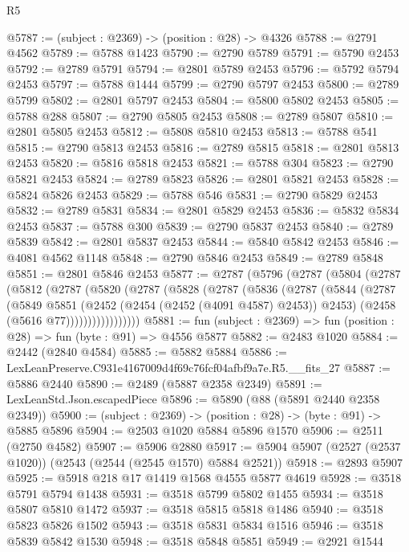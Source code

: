 \begin{lexlean}{R5}
\begin{coremodule}
@5787 := (subject : @2369) -> (position : @28) -> @4326
@5788 := @2791 @4562
@5789 := @5788 @1423
@5790 := @2790 @5789
@5791 := @5790 @2453
@5792 := @2789 @5791
@5794 := @2801 @5789 @2453
@5796 := @5792 @5794 @2453
@5797 := @5788 @1444
@5799 := @2790 @5797 @2453
@5800 := @2789 @5799
@5802 := @2801 @5797 @2453
@5804 := @5800 @5802 @2453
@5805 := @5788 @288
@5807 := @2790 @5805 @2453
@5808 := @2789 @5807
@5810 := @2801 @5805 @2453
@5812 := @5808 @5810 @2453
@5813 := @5788 @541
@5815 := @2790 @5813 @2453
@5816 := @2789 @5815
@5818 := @2801 @5813 @2453
@5820 := @5816 @5818 @2453
@5821 := @5788 @304
@5823 := @2790 @5821 @2453
@5824 := @2789 @5823
@5826 := @2801 @5821 @2453
@5828 := @5824 @5826 @2453
@5829 := @5788 @546
@5831 := @2790 @5829 @2453
@5832 := @2789 @5831
@5834 := @2801 @5829 @2453
@5836 := @5832 @5834 @2453
@5837 := @5788 @300
@5839 := @2790 @5837 @2453
@5840 := @2789 @5839
@5842 := @2801 @5837 @2453
@5844 := @5840 @5842 @2453
@5846 := @4081 @4562 @1148
@5848 := @2790 @5846 @2453
@5849 := @2789 @5848
@5851 := @2801 @5846 @2453
@5877 := @2787
    (@5796
      (@2787
        (@5804
          (@2787
            (@5812
              (@2787
                (@5820
                  (@2787
                    (@5828
                      (@2787
                        (@5836
                          (@2787
                            (@5844
                              (@2787
                                (@5849
                                  @5851
                                  (@2452 (@2454 (@2452 (@4091 @4587) @2453)) @2453)
                                  (@2458 (@5616 @77)))))))))))))))))
@5881 := fun (subject : @2369) => fun (position : @28) => fun (byte : @91) => @4556 @5877
@5882 := @2483 @1020
@5884 := @2442 (@2840 @4584)
@5885 := @5882 @5884
@5886 := LexLeanPreserve.C931e4167009d4f69c76fcf04afbf9a7e.R5.__fits_27
@5887 := @5886 @2440
@5890 := @2489 (@5887 @2358 @2349)
@5891 := LexLeanStd.Json.escapedPiece
@5896 := @5890 (@88 (@5891 @2440 @2358 @2349))
@5900 := (subject : @2369) -> (position : @28) -> (byte : @91) -> @5885 @5896
@5904 := @2503 @1020 @5884 @5896 @1570
@5906 := @2511 (@2750 @4582)
@5907 := @5906 @2880
@5917 := @5904 @5907 (@2527 (@2537 @1020)) (@2543 (@2544 (@2545 @1570) @5884 @2521))
@5918 := @2893 @5907
@5925 := @5918 @218 @17 @1419 @1568 @4555 @5877 @4619
@5928 := @3518 @5791 @5794 @1438
@5931 := @3518 @5799 @5802 @1455
@5934 := @3518 @5807 @5810 @1472
@5937 := @3518 @5815 @5818 @1486
@5940 := @3518 @5823 @5826 @1502
@5943 := @3518 @5831 @5834 @1516
@5946 := @3518 @5839 @5842 @1530
@5948 := @3518 @5848 @5851
@5949 := @2921 @1544

\end{coremodule}
\end{lexlean}
